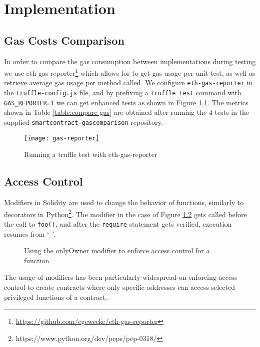 \chapter{Implementation}

\section{Gas Costs Comparison}

In order to compare the gas consumption between implementations during testing we use eth-gas-reporter\footnote{\url{https://github.com/cgewecke/eth-gas-reporter}} which allows for to get gas usage per unit test, as well as retrieve average gas usage per method called. We configure \texttt{eth-gas-reporter} in the \texttt{truffle-config.js} file, and by prefixing a \texttt{truffle test} command with \texttt{GAS\_REPORTER=1} we can get enhanced tests as shown in Figure \ref{fig:gas-reporter}. The metrics shown in Table \ref{table:compare-gas} are obtained after running the 4 tests in the supplied \texttt{smartcontract-gascomparison} repository.

\begin{figure}[htb]
    \centering
    \texttt{[image: gas-reporter]}
    \caption{Running a truffle test with eth-gas-reporter}
    \label{fig:gas-reporter}
\end{figure}

\section{Access Control}\label{apx:implementation:acl}

Modifiers in Solidity are used to change the behavior of functions, similarly to decorators in Python\footnote{https://www.python.org/dev/peps/pep-0318/}. The modifier in the case of Figure \ref{fig:ownable} gets called before the call to \texttt{foo()}, and after the \texttt{require} statement gets verified, execution resumes from `\texttt{\_}'.


\begin{figure}[ht!]
    \centering
    
    \caption{Using the onlyOwner modifier to enforce access control for a function}
    \label{fig:ownable}
\end{figure}

The usage of modifiers has been particularly widespread on enforcing access control to create contracts where only specific addresses can access selected privileged functions of a contract. 

